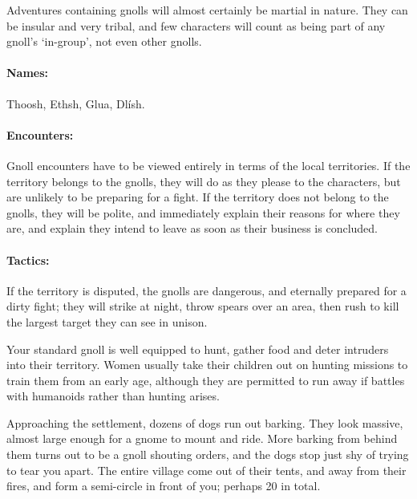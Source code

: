 \begin{multicols}{2}
\label{gnoll_hunter}

Adventures containing gnolls will almost certainly be martial in nature.  They can be insular and very tribal, and few characters will count as being part of any gnoll's `in-group', not even other gnolls.

\paragraph{Names:} Thoosh, Ethsh, Glua, Dl\'{i}sh.



\paragraph{Encounters:} Gnoll encounters have to be viewed entirely in terms of the local territories.
If the territory belongs to the gnolls, they will do as they please to the characters, but are unlikely to be preparing for a fight.
If the territory does not belong to the gnolls, they will be polite, and immediately explain their reasons for where they are, and explain they intend to leave as soon as their business is concluded.
\paragraph{Tactics:}
If the territory is disputed, the gnolls are dangerous, and eternally prepared for a dirty fight; they will strike at night, throw spears over an area, then rush to kill the largest target they can see in unison.

Your standard gnoll is well equipped to hunt, gather food and deter intruders into their territory.
Women usually take their children out on hunting missions to train them from an early age, although they are permitted to run away if battles with humanoids rather than hunting arises.

\begin{boxtext}

  Approaching the settlement, dozens of dogs run out barking.
  They look massive, almost large enough for a gnome to mount and ride.
  More barking from behind them turns out to be a gnoll shouting orders, and the dogs stop just shy of trying to tear you apart.
  The entire village come out of their tents, and away from their fires, and form a semi-circle in front of you; perhaps 20 in total.


\end{boxtext}
\end{multicols}
